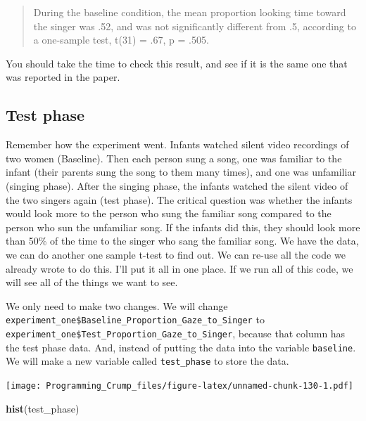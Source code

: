 \documentclass[]{book}
\newenvironment{Shaded}{\begin{snugshade}}{\end{snugshade}}
\newcommand{\KeywordTok}[1]{\textcolor[rgb]{0.13,0.29,0.53}{\textbf{{#1}}}}
\newcommand{\StringTok}[1]{\textcolor[rgb]{0.31,0.60,0.02}{{#1}}}
\newcommand{\NormalTok}[1]{{#1}}
\theoremstyle{definition}
\theoremstyle{definition}
\theoremstyle{definition}
\theoremstyle{remark}
\begin{document}
\begin{quote}
During the baseline condition, the mean proportion looking time toward
the singer was .52, and was not significantly different from .5,
according to a one-sample test, t(31) = .67, p = .505.
\end{quote}

You should take the time to check this result, and see if it is the same
one that was reported in the paper.

\subsection{Test phase}\label{test-phase}

Remember how the experiment went. Infants watched silent video
recordings of two women (Baseline). Then each person sung a song, one
was familiar to the infant (their parents sung the song to them many
times), and one was unfamiliar (singing phase). After the singing phase,
the infants watched the silent video of the two singers again (test
phase). The critical question was whether the infants would look more to
the person who sung the familiar song compared to the person who sun the
unfamiliar song. If the infants did this, they should look more than
50\% of the time to the singer who sang the familiar song. We have the
data, we can do another one sample t-test to find out. We can re-use all
the code we already wrote to do this. I'll put it all in one place. If
we run all of this code, we will see all of the things we want to see.

We only need to make two changes. We will change
\texttt{experiment\_one\$Baseline\_Proportion\_Gaze\_to\_Singer} to
\texttt{experiment\_one\$Test\_Proportion\_Gaze\_to\_Singer}, because
that column has the test phase data. And, instead of putting the data
into the variable \texttt{baseline}. We will make a new variable called
\texttt{test\_phase} to store the data.

\begin{Shaded}
\end{Shaded}

\texttt{[image: Programming\_Crump\_files/figure-latex/unnamed-chunk-130-1.pdf]}

\begin{Shaded}
\begin{Highlighting}[]
\KeywordTok{hist}\NormalTok{(test_phase)}
\end{Highlighting}
\end{Shaded}
\end{document}
